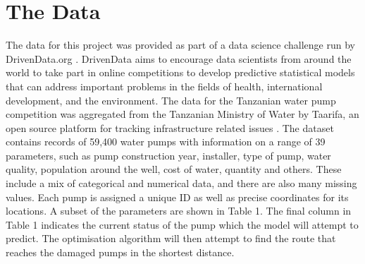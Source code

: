 \documentclass{article} %
\begin{document}
\section{The Data}

The data for this project was provided as part of a data science challenge run by DrivenData.org \cite{DrivenData2015}. DrivenData aims to encourage data scientists from around the world to take part in online competitions to develop predictive statistical models that can address important problems in the fields of health, international development, and the environment. The data for the Tanzanian water pump competition was aggregated from the Tanzanian Ministry of Water by Taarifa, an open source platform for tracking infrastructure related issues \cite{Taarifa2015}.  The dataset contains records of 59,400 water pumps with information on a range of 39 parameters, such as pump construction year, installer, type of pump, water quality, population around the well, cost of water, quantity and others. These include a mix of categorical and numerical data, and there are also many missing values. Each pump is assigned a unique ID as well as precise coordinates for its locations. A subset of the parameters are shown in Table 1. The final column in Table 1 indicates the current status of the pump which the model will attempt to predict. The optimisation algorithm will then attempt to find the route that reaches the damaged pumps in the shortest distance.

\begin{table}[H]
\caption{Sample of the DrivenData Tanzania water wells dataset}
\centering
{}
\end{table}
\end{document}
